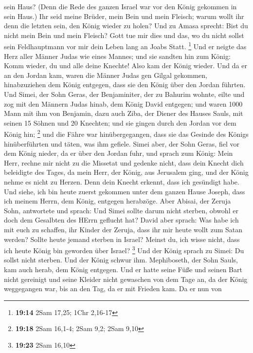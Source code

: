 sein Haus? (Denn die Rede des ganzen Israel war vor den König gekommen
in sein Haus.)  Ihr seid meine Brüder, mein Bein und mein
Fleisch; warum wollt ihr denn die letzten sein, den König wieder zu
holen?  Und zu Amasa sprecht: Bist du nicht mein Bein und
mein Fleisch? Gott tue mir dies und das, wo du nicht sollst sein
Feldhauptmann vor mir dein Leben lang an Joabs Statt. \footnote{\textbf{19:14}
  2Sam 17,25; 1Chr 2,16-17}  Und er neigte das Herz aller
Männer Judas wie eines Mannes; und sie sandten hin zum König: Komm
wieder, du und alle deine Knechte!  Also kam der König
wieder. Und da er an den Jordan kam, waren die Männer Judas gen Gilgal
gekommen, hinabzuziehen dem König entgegen, dass sie den König über den
Jordan führten.  Und Simei, der Sohn Geras, der
Benjaminiter, der zu Bahurim wohnte, eilte und zog mit den Männern Judas
hinab, dem König David entgegen;  und waren 1000 Mann mit
ihm von Benjamin, dazu auch Ziba, der Diener des Hauses Sauls, mit
seinen 15 Söhnen und 20 Knechten; und sie gingen durch den Jordan vor
dem König hin; \footnote{\textbf{19:18} 2Sam 16,1-4; 2Sam 9,2; 2Sam 9,10}
 und die Fähre war hinübergegangen, dass sie das Gesinde
des Königs hinüberführten und täten, was ihm gefiele. Simei aber, der
Sohn Geras, fiel vor dem König nieder, da er über den Jordan fuhr,
 und sprach zum König: Mein Herr, rechne mir nicht zu die
Missetat und gedenke nicht, dass dein Knecht dich beleidigte des Tages,
da mein Herr, der König, aus Jerusalem ging, und der König nehme es
nicht zu Herzen.  Denn dein Knecht erkennt, dass ich
gesündigt habe. Und siehe, ich bin heute zuerst gekommen unter dem
ganzen Hause Joseph, dass ich meinem Herrn, dem König, entgegen
herabzöge.  Aber Abisai, der Zeruja Sohn, antwortete und
sprach: Und Simei sollte darum nicht sterben, obwohl er doch dem
Gesalbten des HErrn geflucht hat?  David aber sprach: Was
habe ich mit euch zu schaffen, ihr Kinder der Zeruja, dass ihr mir heute
wollt zum Satan werden? Sollte heute jemand sterben in Israel? Meinst
du, ich wisse nicht, dass ich heute König bin geworden über Israel?
\footnote{\textbf{19:23} 2Sam 16,10}  Und der König sprach
zu Simei: Du sollst nicht sterben. Und der König schwur ihm.
 Mephiboseth, der Sohn Sauls, kam auch herab, dem König
entgegen. Und er hatte seine Füße und seinen Bart nicht gereinigt und
seine Kleider nicht gewaschen von dem Tage an, da der König weggegangen
war, bis an den Tag, da er mit Frieden kam.  Da er nun von
